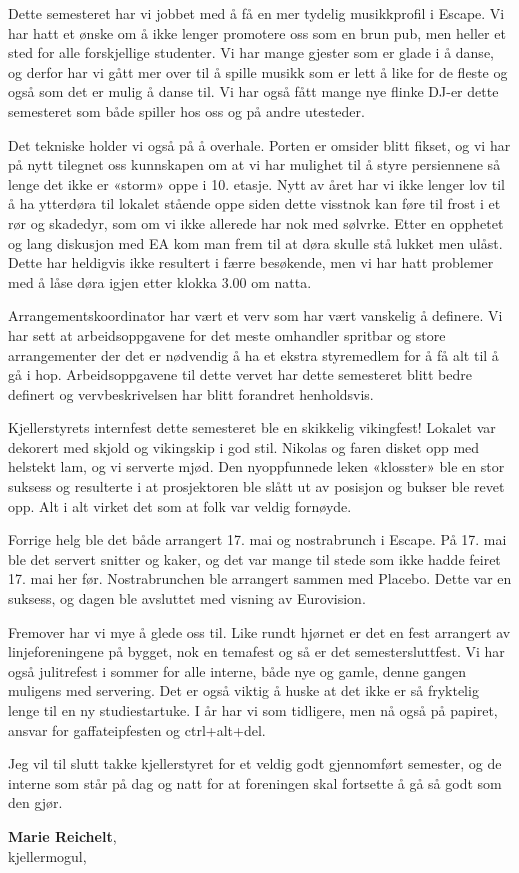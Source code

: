 \documentclass[10pt,norsk,a4paper]{article}
\begin{document}
\begin{multicols}{2}
Dette semesteret har vi jobbet med å få en mer tydelig musikkprofil i Escape.
Vi har hatt et ønske om å ikke lenger promotere oss som en brun pub, men
heller et sted for alle forskjellige studenter. Vi har mange gjester som er
glade i å danse, og derfor har vi gått mer over til å spille musikk som er
lett å like for de fleste og også som det er mulig å danse til. Vi har også
fått mange nye flinke DJ-er dette semesteret som både spiller hos oss
og på andre utesteder.

Det tekniske holder vi også på å overhale. Porten er omsider blitt fikset,
og vi har på nytt tilegnet oss kunnskapen om at vi har mulighet til å styre
persiennene så lenge det ikke er «storm» oppe i 10. etasje. Nytt av året
har vi ikke lenger lov til å ha ytterdøra til lokalet stående oppe siden
dette visstnok kan føre til frost i et rør og skadedyr, som om vi ikke allerede
har nok med sølvrke. Etter en opphetet og lang diskusjon med EA kom man frem
til at døra skulle stå lukket men ulåst. Dette har heldigvis ikke resultert i
færre besøkende, men vi har hatt problemer med å låse døra igjen etter
klokka 3.00 om natta.

Arrangementskoordinator har vært et verv som har vært vanskelig å definere.
Vi har sett at arbeidsoppgavene for det meste omhandler spritbar og store
arrangementer der det er nødvendig å ha et ekstra styremedlem for å få alt
til å gå i hop. Arbeidsoppgavene til dette vervet har dette semesteret blitt
bedre definert og vervbeskrivelsen har blitt forandret henholdsvis.

Kjellerstyrets internfest dette semesteret ble en skikkelig vikingfest!
Lokalet var dekorert med skjold og vikingskip i god stil. Nikolas og faren
disket opp med helstekt lam, og vi serverte mjød. Den nyoppfunnede leken
«klosster» ble en stor suksess og resulterte i at prosjektoren ble slått ut
av posisjon og bukser ble revet opp. Alt i alt virket det som at
folk var veldig fornøyde.

Forrige helg ble det både arrangert 17. mai og nostrabrunch i Escape.
På 17. mai ble det servert snitter og kaker, og det var mange til stede
som ikke hadde feiret 17. mai her før. Nostrabrunchen ble arrangert sammen
med Placebo. Dette var en suksess, og dagen ble avsluttet med visning av Eurovision.

Fremover har vi mye å glede oss til. Like rundt hjørnet er det en fest arrangert
av linjeforeningene på bygget, nok en temafest og så er det semestersluttfest.
Vi har også julitrefest i sommer for alle interne, både nye og gamle, denne
gangen muligens med servering. Det er også viktig å huske at det ikke er så
fryktelig lenge til en ny studiestartuke. I år har vi som tidligere, men nå
også på papiret, ansvar for gaffateipfesten og ctrl+alt+del.

Jeg vil til slutt takke kjellerstyret for et veldig godt gjennomført semester,
og de interne som står på dag og natt for at foreningen skal fortsette å
gå så godt som den gjør.
\end{multicols}
\textbf{Marie Reichelt}, \\
kjellermogul, \date{\emph{23. mai 2019}}
\end{document}
